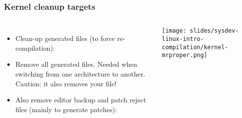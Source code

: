 \begin{frame}
  \frametitle{Kernel cleanup targets}
  \begin{columns}
    \begin{itemize}
    \item Clean-up generated files (to force re-compilation):\\
    \item Remove all generated files. Needed when switching from one
      architecture to another. Caution: it also removes your  file!\\
    \item Also remove editor backup and patch reject files (mainly to
      generate patches):\\
    \end{itemize}
    \texttt{[image: slides/sysdev-linux-intro-compilation/kernel-mrproper.png]}
  \end{columns}
\end{frame}
